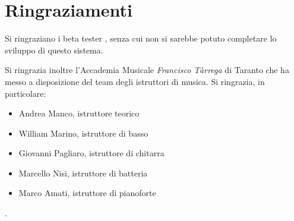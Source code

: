 \chapter*{Ringraziamenti}

Si ringraziano i beta tester , senza cui non si sarebbe
potuto completare lo sviluppo di questo sistema.

Si ringrazia inoltre l'Accademia Musicale \textit{Francisco Tàrrega} di Taranto
che ha messo a disposizione del team degli istruttori di musica. Si ringrazia,
in particolare:
\begin{itemize}
	\item Andrea Manco, istruttore teorico
	\item William Marino, istruttore di basso
	\item Giovanni Pagliaro, istruttore di chitarra
	\item Marcello Nisi, istruttore di batteria
	\item Marco Amati, istruttore di pianoforte
\end{itemize}.